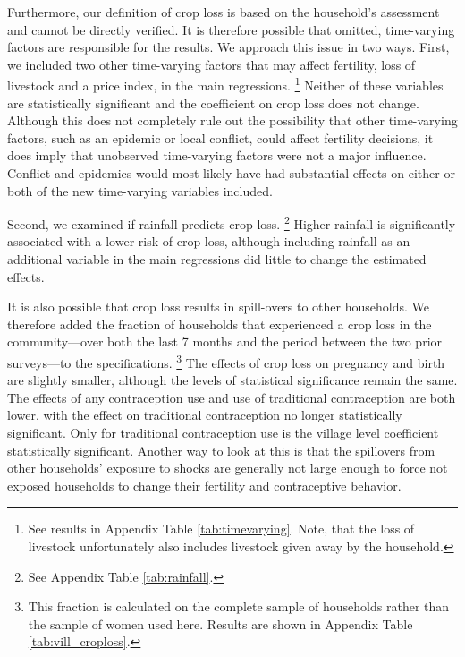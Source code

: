 \documentclass[letterpaper,12pt]{article}
\begin{document}
Furthermore, our definition of crop loss is based on the 
household's assessment and cannot be directly verified.
It is therefore possible that omitted, time-varying 
factors are responsible for the results. 
We approach this issue in two ways.
First, we included two other time-varying factors that
may affect fertility, loss of livestock and a price
index, in the main regressions.%
\footnote{
See results in Appendix Table \ref{tab:timevarying}.
Note, that the loss of livestock unfortunately also
includes livestock given away by the household.
}
Neither of these variables are statistically significant
and the coefficient on crop loss does not change.
Although this does not completely rule out the possibility
that other time-varying factors, such as an epidemic or
local conflict, could affect fertility decisions, it does
imply that unobserved time-varying factors were not a 
major influence.
Conflict and epidemics would most likely have had 
substantial effects on either or both of the new
time-varying variables included.

Second, we examined if rainfall predicts crop loss.%
\footnote{
See Appendix Table \ref{tab:rainfall}.
}
Higher rainfall is significantly associated with a 
lower risk of crop loss,
although including rainfall as an additional
variable in the main regressions did little to
change the estimated effects.


It is also possible that crop loss results in spill-overs to other
households.
We therefore added the fraction of households that experienced a crop
loss in the community---over both the last 7 months and the period 
between the two prior surveys---to the specifications.%
\footnote{
This fraction is calculated on the complete sample of households
rather than the sample of women used here.
Results are shown in Appendix Table \ref{tab:vill_croploss}.
}
The effects of crop loss on pregnancy and birth are slightly smaller,
although the levels of statistical significance remain the same.
The effects of any contraception use and use of traditional
contraception are both lower, with the effect on traditional
contraception no longer statistically significant.
Only for traditional contraception use is the village level 
coefficient statistically significant.
Another way to look at this is that the spillovers from other
households' exposure to shocks are generally not large enough to 
force not exposed households to change their fertility and 
contraceptive behavior.
\end{document}
